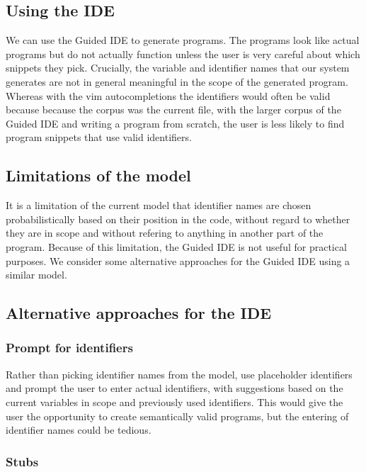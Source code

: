 \documentclass{article}
\begin{document}
\subsection{Using the IDE}

We can use the Guided IDE to generate programs. The programs look like actual
programs but do not actually function unless the user is very careful about
which snippets they pick. Crucially, the variable and identifier names that our
system generates are not in general meaningful in the scope of the generated
program.  Whereas with the vim autocompletions the identifiers would often be
valid because because the corpus was the current file, with the larger corpus of
the Guided IDE and writing a program from scratch, the user is less likely to
find program snippets that use valid identifiers.

\subsection{Limitations of the model}

It is a limitation of the current model that identifier names are chosen
probabilistically based on their position in the code, without regard to whether
they are in scope and without refering to anything in another part of the
program. Because of this limitation, the Guided IDE is not useful for practical
purposes. We consider some alternative approaches for the Guided IDE using a
similar model.

\subsection{Alternative approaches for the IDE}

\subsubsection{Prompt for identifiers}

Rather than picking identifier names from the model, use placeholder identifiers
and prompt the user to enter actual identifiers, with suggestions based on the
current variables in scope and previously used identifiers. This would give the
user the opportunity to create semantically valid programs, but the entering of
identifier names could be tedious.

\subsubsection{Stubs}
\end{document}
